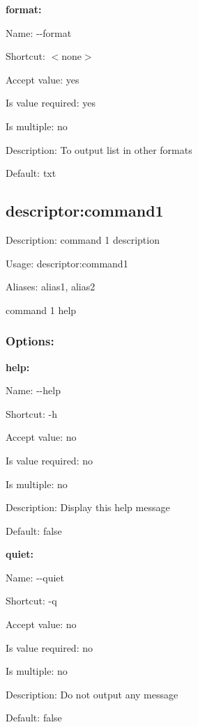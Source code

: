{\bfseries format\+:}


\begin{DoxyItemize}
\item Name\+: {\ttfamily -\/-\/format}
\item Shortcut\+: $<$none$>$
\item Accept value\+: yes
\item Is value required\+: yes
\item Is multiple\+: no
\item Description\+: To output list in other formats
\item Default\+: {\ttfamily \textquotesingle{}txt\textquotesingle{}}
\end{DoxyItemize}

\subsection*{descriptor\+:command1 }


\begin{DoxyItemize}
\item Description\+: command 1 description
\item Usage\+: {\ttfamily descriptor\+:command1}
\item Aliases\+: {\ttfamily alias1}, {\ttfamily alias2}
\end{DoxyItemize}

command 1 help

\subsubsection*{Options\+:}

{\bfseries help\+:}


\begin{DoxyItemize}
\item Name\+: {\ttfamily -\/-\/help}
\item Shortcut\+: {\ttfamily -\/h}
\item Accept value\+: no
\item Is value required\+: no
\item Is multiple\+: no
\item Description\+: Display this help message
\item Default\+: {\ttfamily false}
\end{DoxyItemize}

{\bfseries quiet\+:}


\begin{DoxyItemize}
\item Name\+: {\ttfamily -\/-\/quiet}
\item Shortcut\+: {\ttfamily -\/q}
\item Accept value\+: no
\item Is value required\+: no
\item Is multiple\+: no
\item Description\+: Do not output any message
\item Default\+: {\ttfamily false}
\end{DoxyItemize}

